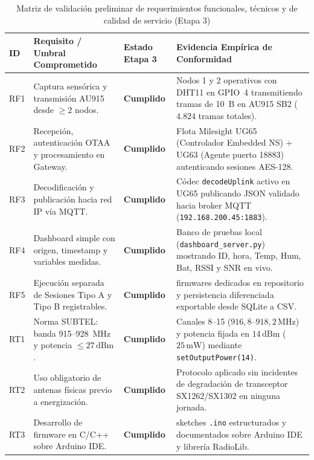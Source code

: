 \documentclass[12pt,oneside,openany,spanish,oldfontcommands]{memoir}
\renewcommand{\arraystretch}{1.15}
\begin{document}
\begin{table}[!htbp]
\centering
\caption{Matriz de validación preliminar de requerimientos funcionales, técnicos y de calidad de servicio (Etapa 3)}
\label{tab:validacion-preliminar}
\scriptsize
\setlength{\tabcolsep}{2.5pt}
\renewcommand{\arraystretch}{0.98}
\begin{tabularx}{\textwidth}{
    >{\bfseries\raggedright\arraybackslash}p{1.1cm}
    >{\raggedright\arraybackslash}p{2.7cm}
    >{\centering\arraybackslash}p{1.8cm}
    >{\raggedright\arraybackslash}X
}
\toprule
\textbf{ID} & \textbf{Requisito / Umbral Comprometido} & \textbf{Estado Etapa 3} & \textbf{Evidencia Empírica de Conformidad} \\
\midrule
RF1 & Captura sensórica y transmisión AU915 desde $\geq 2$ nodos. & \textbf{Cumplido} & Nodos 1 y 2 operativos con DHT11 en GPIO~4 transmitiendo tramas de 10~B en AU915 SB2 ($4.824$ tramas totales). \\
\midrule
RF2 & Recepción, autenticación OTAA y procesamiento en Gateway. & \textbf{Cumplido} & Flota Milesight UG65 (Controlador Embedded NS) + UG63 (Agente puerto 18883) autenticando sesiones AES-128. \\
\midrule
RF3 & Decodificación y publicación hacia red IP vía MQTT. & \textbf{Cumplido} & Códec \texttt{decodeUplink} activo en UG65 publicando JSON validado hacia broker MQTT (\texttt{192.168.200.45:1883}). \\
\midrule
RF4 & Dashboard simple con origen, timestamp y variables medidas. & \textbf{Cumplido} & Banco de pruebas local (\texttt{dashboard\_server.py}) mostrando ID, hora, Temp, Hum, Bat, RSSI y SNR en vivo. \\
\midrule
RF5 & Ejecución separada de Sesiones Tipo A y Tipo B registrables. & \textbf{Cumplido} & 4 firmwares dedicados en repositorio y persistencia diferenciada exportable desde SQLite a CSV. \\
\midrule
RT1 & Norma SUBTEL: banda 915--928~MHz y potencia $\leq 27\,\text{dBm}$. & \textbf{Cumplido} & Canales 8--15 ($916,8\text{--}918,2\,\text{MHz}$) y potencia fijada en $14\,\text{dBm}$ ($25\,\text{mW}$) mediante \texttt{setOutputPower(14)}. \\
\midrule
RT2 & Uso obligatorio de antenas físicas previo a energización. & \textbf{Cumplido} & Protocolo aplicado sin incidentes de degradación de transceptor SX1262/SX1302 en ninguna jornada. \\
\midrule
RT3 & Desarrollo de firmware en C/C++ sobre Arduino IDE. & \textbf{Cumplido} & 4 sketches \texttt{.ino} estructurados y documentados sobre Arduino IDE y librería RadioLib. \\

\end{tabularx}
\end{table}
\end{document}
